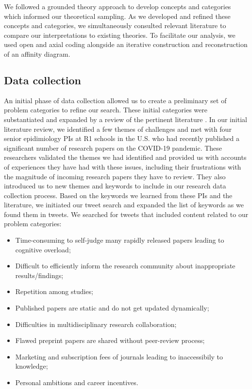 \documentclass[acmsmall,authordraft]{acmart}
\begin{document}
We followed a grounded theory \citep{glaser1998doing} approach to develop concepts and categories which informed our theoretical sampling. As we developed and refined these concepts and categories, we simultaneously consulted relevant literature to compare our interpretations to existing theories. To facilitate our analysis, we used open and axial coding alongside an iterative construction and reconstruction of an affinity diagram.

\subsection{Data collection}
\label{Data collection}

An initial phase of data collection allowed us to create a preliminary set of problem categories to refine our search. These initial categories were substantiated and expanded by a review of the pertinent literature \citep{Brainard2020drowning, apuzzo2020covid, palayew2020pandemic}. In our initial literature review, we identified a few themes of challenges and met with four senior epidimiology PIs at R1 schools in the U.S. who had recently published a significant number of research papers on the COVID-19 pandemic. These researchers validated the themes we had identified and provided us with accounts of experiences they have had with these issues, including their frustrations with the magnitude of incoming research papers they have to review. They also introduced us to new themes and keywords to include in our research data collection process. Based on the keywords we learned from these PIs and the literature, we initiated our tweet search and expanded the list of keywords as we found them in tweets. We searched for tweets that included content related to our problem categories:

\begin{itemize}
    \item Time-consuming to self-judge many rapidly released papers leading to cognitive overload;
    \item Difficult to efficiently inform the research community about inappropriate results/findings;
    \item Repetition among studies;
    \item Published papers are static and do not get updated dynamically;
    \item Difficulties in multidisciplinary research collaboration;
    \item Flawed preprint papers are shared without peer-review process;
    \item Marketing and subscription fees of journals leading to inaccessibily to knowledge;
    \item Personal ambitions and career incentives.
\end{itemize}
\end{document}
